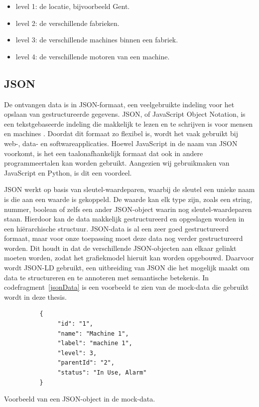 \begin{itemize}
     \item level 1: de locatie, bijvoorbeeld Gent.
     \item level 2: de verschillende fabrieken.
     \item level 3: de verschillende machines binnen een fabriek.
     \item level 4: de verschillende motoren van een machine.
\end{itemize}

\subsection{JSON}
De ontvangen data is in JSON-formaat, een veelgebruikte indeling voor het opslaan van gestructureerde gegevens.
JSON, of JavaScript Object Notation, is een tekstgebaseerde indeling die makkelijk te lezen en te schrijven is voor mensen en machines \autocite{Erickson2024}.
Doordat dit formaat zo flexibel is, wordt het vaak gebruikt bij web-, data- en softwareapplicaties.
Hoewel JavaScript in de naam van JSON voorkomt, is het een taalonafhankelijk formaat dat ook in andere programmeertalen kan worden gebruikt.
Aangezien wij gebruikmaken van JavaScript en Python, is dit een voordeel.

JSON werkt op basis van sleutel-waardeparen, waarbij de sleutel een unieke naam is die aan een waarde is gekoppeld.
De waarde kan elk type zijn, zoals een string, nummer, boolean of zelfs een ander JSON-object waarin nog sleutel-waardeparen staan.
Hierdoor kan de data makkelijk gestructureerd en opgeslagen worden in een hiërarchische structuur.
JSON-data is al een zeer goed gestructureerd formaat, maar voor onze toepassing moet deze data nog verder gestructureerd worden.
Dit houdt in dat de verschillende JSON-objecten aan elkaar gelinkt moeten worden, zodat het grafiekmodel hieruit kan worden opgebouwd.
Daarvoor wordt JSON-LD gebruikt, een uitbreiding van JSON die het mogelijk maakt om data te structureren en te annoteren met semantische betekenis.
In codefragment~\ref{jsonData} is een voorbeeld te zien van de mock-data die gebruikt wordt in deze thesis.

\begin{listing} [H]
     \begin{verbatim}
          {
               "id": "1",
               "name": "Machine 1",
               "label": "machine 1",
               "level": 3,
               "parentId": "2",
               "status": "In Use, Alarm"
          }
     \end{verbatim}
     \caption[Voorbeeld van een JSON-object]{\label{jsonData}Voorbeeld van een JSON-object in de mock-data.}
\end{listing}

